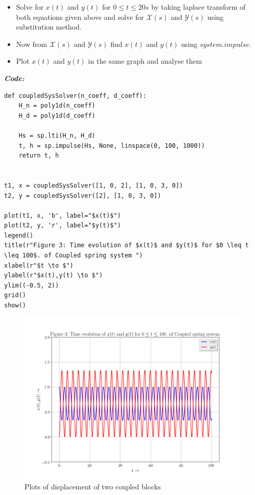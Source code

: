 \documentclass[11pt, a4paper]{article}
\begin{document}
\begin{itemize}
\item
  Solve for $x(t)$ and $y(t)$ for $ 0 \leq t \leq 20s$ by taking
  laplace transform of both equations given above and solve for
  \(\mathcal {X}(s)\) and \(\mathcal{Y}(s)\) using substitution method.
\item
  Now from \(\mathcal {X}(s)\) and \(\mathcal{Y}(s)\) find \(x(t)\) and
  \(y(t)\) using \(system.impulse\).
\item
  Plot \(x(t)\) and \(y(t)\) in the same graph and analyse them
\end{itemize}
\textit{\textbf{Code:}}
\begin{lstlisting}
def coupledSysSolver(n_coeff, d_coeff):
    H_n = poly1d(n_coeff)
    H_d = poly1d(d_coeff)

    Hs = sp.lti(H_n, H_d)
    t, h = sp.impulse(Hs, None, linspace(0, 100, 1000))
    return t, h


t1, x = coupledSysSolver([1, 0, 2], [1, 0, 3, 0])
t2, y = coupledSysSolver([2], [1, 0, 3, 0])

plot(t1, x, 'b', label="$x(t)$")
plot(t2, y, 'r', label="$y(t)$")
legend()
title(r"Figure 3: Time evolution of $x(t)$ and $y(t)$ for $0 \leq t 
\leq 100$. of Coupled spring system ")
xlabel(r"$t \to $")
ylabel(r"$x(t),y(t) \to $")
ylim((-0.5, 2))
grid()
show()
\end{lstlisting}
\newpage
\begin{figure}[!tbh]

  \centering
\includegraphics[scale=0.5]{./../Extras/A63.png}  %
    \caption{Plots of displacement of two coupled blocks}
\end{figure}
\newpage
\end{document}
